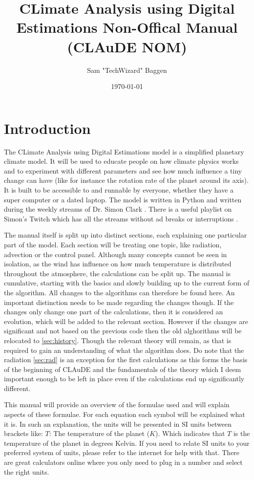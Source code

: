 \documentclass{article}
\title{CLimate Analysis using Digital Estimations Non-Offical Manual (CLAuDE NOM)}
\author{Sam "TechWizard" Baggen}
\date{\today}
\begin{document}
\maketitle

\tableofcontents

\newpage

\section{Introduction}

The CLimate Analysis using Digital Estimations model is a simplified planetary climate model. It will be used to educate people on how climate physics works and to experiment with different 
parameters and see how much influence a tiny change can have (like for instance the rotation rate of the planet around its axis). It is built to be accessible to and runnable by everyone, 
whether they have a super computer or a dated laptop. The model is written in Python and written during the weekly streams of Dr. Simon Clark \cite{twitch}. There is a useful playlist on 
Simon's Twitch which has all the streams without ad breaks or interruptions \cite{playlist}. 

The manual itself is split up into distinct sections, each explaining one particular part of the model. Each section will be treating one topic, like radiation, advection or the control panel.
Although many concepts cannot be seen in isolation, as the wind has influence on how much temperature is distributed throughout the atmosphere, the calculations can be split up. The manual is 
cumulative, starting with the basics and slowly building up to the current form of the algorithm. All changes to the algorithms can therefore be found here. An important distinction needs to be 
made regarding the changes though. If the changes only change one part of the calculations, then it is considered an evolution, which will be added to the relevant section. However if the changes 
are significant and not based on the previous code then the old alghorithms will be relocated to \autoref{sec:history}. Though the relevant theory will remain, as that is required to gain an 
understanding of what the algorithm does. Do note that the radiation \autoref{sec:rad} is an exception for the first calculations as this forms the basis of the beginning of CLAuDE and the 
fundamentals of the theory which I deem important enough to be left in place even if the calculations end up significantly different.

This manual will provide an overview of the formulae used and will explain aspects of these formulae. For each equation each symbol will be explained what it is. In such an explanation, the units 
will be presented in SI units \cite{SI} between brackets like: $T$: The temperature of the planet ($K$). Which indicates that $T$ is the temperature of the planet in degrees Kelvin. If you need 
to relate SI units to your preferred system of units, please refer to the internet for help with that. There are great calculators online where you only need to plug in a number and select the 
right units.
\end{document}
